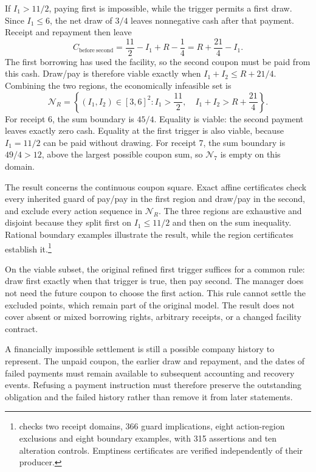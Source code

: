 If $I_1>11/2$, paying first is impossible, while the trigger permits a first draw. Since $I_1\le6$, the net draw of $3/4$ leaves nonnegative cash after that payment. Receipt and repayment then leave
\begin{equation}
 C_{\mathrm{before\ second}}=\frac{11}{2}-I_1+R-\frac14
 =R+\frac{21}{4}-I_1.
 \label{eq:viability-second-cash}
\end{equation}
The first borrowing has used the facility, so the second coupon must be paid from this cash. Draw/pay is therefore viable exactly when $I_1+I_2\le R+21/4$. Combining the two regions, the economically infeasible set is
\begin{equation}
 \mathcal N_R=\left\{(I_1,I_2)\in[3,6]^2:
 I_1>\frac{11}{2},\quad I_1+I_2>R+\frac{21}{4}\right\}.
 \label{eq:committed-infeasible-region}
\end{equation}
For receipt 6, the sum boundary is $45/4$. Equality is viable: the second payment leaves exactly zero cash. Equality at the first trigger is also viable, because $I_1=11/2$ can be paid without drawing. For receipt 7, the sum boundary is $49/4>12$, above the largest possible coupon sum, so $\mathcal N_7$ is empty on this domain.

The result concerns the continuous coupon square. Exact affine certificates check every inherited guard of pay/pay in the first region and draw/pay in the second, and exclude every action sequence in $\mathcal N_R$. The three regions are exhaustive and disjoint because they split first on $I_1\le11/2$ and then on the sum inequality. Rational boundary examples illustrate the result, while the region certificates establish it.\footnote{ checks two receipt domains, 366 guard implications, eight action-region exclusions and eight boundary examples, with 315 assertions and ten alteration controls. Emptiness certificates are verified independently of their producer.}

On the viable subset, the original refined first trigger suffices for a common rule: draw first exactly when that trigger is true, then pay second. The manager does not need the future coupon to choose the first action. This rule cannot settle the excluded points, which remain part of the original model. The result does not cover absent or mixed borrowing rights, arbitrary receipts, or a changed facility contract.

A financially impossible settlement is still a possible company history to represent. The unpaid coupon, the earlier draw and repayment, and the dates of failed payments must remain available to subsequent accounting and recovery events. Refusing a payment instruction must therefore preserve the outstanding obligation and the failed history rather than remove it from later statements.
